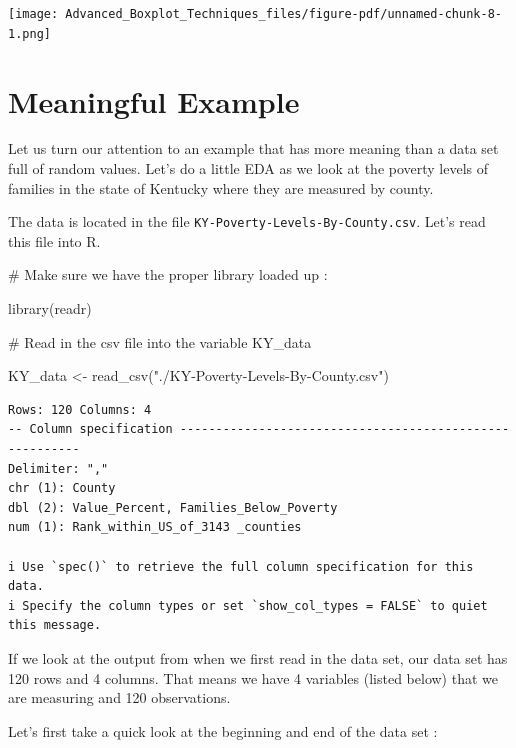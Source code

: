 \documentclass[
  letterpaper,
  DIV=11,
  numbers=noendperiod]{scrreprt}
\newenvironment{Shaded}{\begin{snugshade}}{\end{snugshade}}
\newcommand{\CommentTok}[1]{\textcolor[rgb]{0.37,0.37,0.37}{#1}}
\newcommand{\FunctionTok}[1]{\textcolor[rgb]{0.28,0.35,0.67}{#1}}
\newcommand{\NormalTok}[1]{\textcolor[rgb]{0.00,0.23,0.31}{#1}}
\newcommand{\OtherTok}[1]{\textcolor[rgb]{0.00,0.23,0.31}{#1}}
\newcommand{\StringTok}[1]{\textcolor[rgb]{0.13,0.47,0.30}{#1}}
\begin{document}
\begin{center}
\texttt{[image: Advanced\_Boxplot\_Techniques\_files/figure-pdf/unnamed-chunk-8-1.png]}
\end{center}

\section*{Meaningful Example}\label{meaningful-example}


Let us turn our attention to an example that has more meaning than a
data set full of random values. Let's do a little EDA as we look at the
poverty levels of families in the state of Kentucky where they are
measured by county.

The data is located in the file
\texttt{KY-Poverty-Levels-By-County.csv}. Let's read this file into R.

\begin{Shaded}
\begin{Highlighting}[]
\CommentTok{\# Make sure we have the proper library loaded up :}

\FunctionTok{library}\NormalTok{(readr)}

\CommentTok{\# Read in the csv file into the variable KY\_data}

\NormalTok{KY\_data }\OtherTok{\textless{}{-}} \FunctionTok{read\_csv}\NormalTok{(}\StringTok{"./KY{-}Poverty{-}Levels{-}By{-}County.csv"}\NormalTok{)}
\end{Highlighting}
\end{Shaded}

\begin{verbatim}
Rows: 120 Columns: 4
-- Column specification --------------------------------------------------------
Delimiter: ","
chr (1): County
dbl (2): Value_Percent, Families_Below_Poverty
num (1): Rank_within_US_of_3143 _counties

i Use `spec()` to retrieve the full column specification for this data.
i Specify the column types or set `show_col_types = FALSE` to quiet this message.
\end{verbatim}

If we look at the output from when we first read in the data set, our
data set has 120 rows and 4 columns. That means we have 4 variables
(listed below) that we are measuring and 120 observations.

Let's first take a quick look at the beginning and end of the data set :
\end{document}
